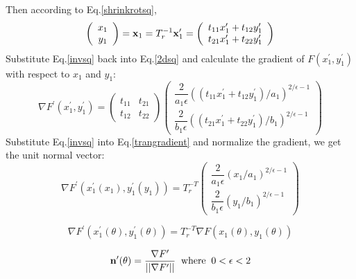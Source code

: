 \documentclass[]{article}
\begin{document}
Then according to Eq.\eqref{shrinkrotsq},
\begin{equation}
\left(
\begin{array}{c}
x_1 \\
y_1
\end{array}
\right)
=
{\bf x}_1
=
T_r^{-1}{\bf x}_1^{\prime}
=
\left(
\begin{array}{c}
t_{11}x_1^{\prime} + t_{12}y_1^{\prime} \\
t_{21}x_1^{\prime} + t_{22}y_1^{\prime}
\end{array}
\right)
\label{invsq}
\end{equation}
Substitute Eq.\eqref{invsq} back into Eq.\eqref{2dsq} and calculate the gradient of $F(x_1^{\prime}, y_1^{\prime})$ with respect to $x_1$ and $y_1$:
\begin{equation}
\nabla F^{\prime}(x_1^{\prime}, y_1^{\prime}) =
\left(
\begin{array}{lr}
t_{11} & t_{21} \\
t_{12} & t_{22}
\end{array}
\right)
\left(
\begin{array}{c}
\dfrac{2}{a_1\epsilon}
\left( \left( t_{11} x_1^{\prime} + t_{12} y_1^{\prime} \right) /a_1 \right)^{2/\epsilon - 1} \\
\dfrac{2}{b_1\epsilon}
\left(\left( t_{21} x_1^{\prime} + t_{22} y_1^{\prime} \right) /b_1 \right)^{2/\epsilon - 1}
\end{array}
\right)
\label{trangradient}
\end{equation}
Substitute Eq.\eqref{invsq} into Eq.\eqref{trangradient} and normalize the gradient, we get the unit normal vector:
\begin{equation}
\nabla F^{\prime}(x_1^{\prime}(x_1), y_1^{\prime}(y_1) ) = T_r^{-T}
\left(
\begin{array}{c}
\dfrac{2}{a_1\epsilon}
\left(x_1 /a_1 \right)^{2/\epsilon - 1} \\
\dfrac{2}{b_1\epsilon}
\left(y_1 /b_1 \right)^{2/\epsilon - 1}
\end{array}
\right)
\end{equation}

\begin{equation}
\nabla F^{\prime}(x_1^{\prime}(\theta), y_1^{\prime}(\theta) ) = T_r^{-T}
\nabla F(x_1(\theta), y_1(\theta))
\end{equation}

\begin{equation}
{\bf n}^{\prime}(\theta) =
\dfrac{\nabla F^{\prime}}{||\nabla F^{\prime}||} \; \; \text{where} \; \; 0 < \epsilon < 2
\end{equation}
\end{document}
